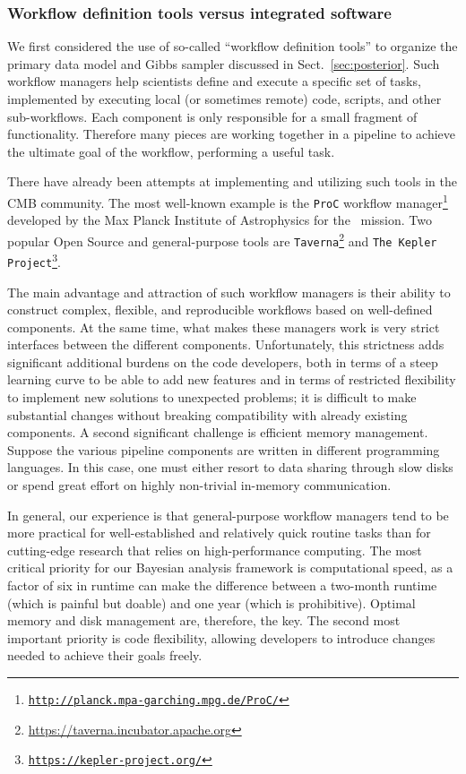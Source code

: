\documentclass[twocolumn]{openjournal}
\begin{document}
\subsubsection{Workflow definition tools versus integrated software}

We first considered the use of so-called ``workflow definition tools'' to
organize the primary data model and Gibbs sampler discussed in
Sect.~\ref{sec:posterior}. Such workflow managers help scientists define and
execute a specific set of tasks, implemented by executing local (or sometimes
remote) code, scripts, and other sub-workflows. Each component is only
responsible for a small fragment of functionality. Therefore many pieces are
working together in a pipeline to achieve the ultimate goal of the workflow,
performing a useful task.

There have already been attempts at implementing and utilizing such tools in
the CMB community. The most well-known example is the \texttt{ProC} workflow
manager\footnote{\href{http://planck.mpa-garching.mpg.de/ProC/}
{\texttt{http://planck.mpa-garching.mpg.de/ProC/}}} developed by the Max Planck
Institute of Astrophysics for the \Planck\ mission. Two popular Open Source and
general-purpose tools are
\texttt{Taverna}\footnote{\url{https://taverna.incubator.apache.org}} and
\texttt{The Kepler Project}\footnote{\href{https://kepler-project.org/}
{\texttt{https://kepler-project.org/}}}.

The main advantage and attraction of such workflow managers is their ability to
construct complex, flexible, and reproducible workflows based on well-defined
components. At the same time, what makes these managers work is very strict
interfaces between the different components. Unfortunately, this strictness
adds significant additional burdens on the code developers, both in terms of a
steep learning curve to be able to add new features and in terms of restricted
flexibility to implement new solutions to unexpected problems; it is difficult
to make substantial changes without breaking compatibility with already
existing components. A second significant challenge is efficient memory
management. Suppose the various pipeline components are written in different
programming languages. In this case, one must either resort to data sharing
through slow disks or spend great effort on highly non-trivial in-memory
communication.

In general, our experience is that general-purpose workflow managers tend to be
more practical for well-established and relatively quick routine tasks than for
cutting-edge research that relies on high-performance computing. The most
critical priority for our Bayesian analysis framework is computational speed,
as a factor of six in runtime can make the difference between a two-month
runtime (which is painful but doable) and one year (which is prohibitive).
Optimal memory and disk management are, therefore, the key. The second most
important priority is code flexibility, allowing developers to introduce
changes needed to achieve their goals freely.
\end{document}
